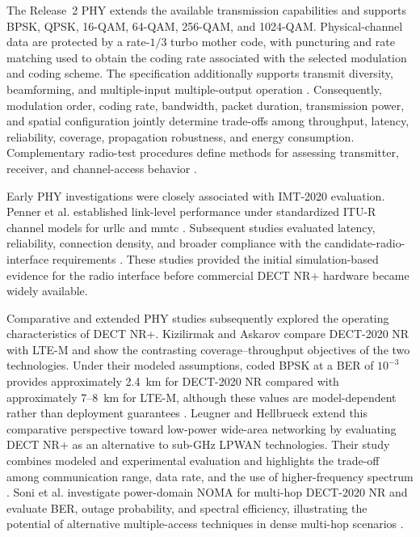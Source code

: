 The Release~2 PHY extends the available transmission capabilities and supports
BPSK, QPSK, 16-QAM, 64-QAM, 256-QAM, and 1024-QAM. Physical-channel data are
protected by a rate-$1/3$ turbo mother code, with puncturing and rate matching
used to obtain the coding rate associated with the selected modulation and
coding scheme. The specification additionally supports transmit diversity,
beamforming, and multiple-input multiple-output operation
\cite{etsi_ts_103636_3_r2}. Consequently, modulation order, coding rate,
bandwidth, packet duration, transmission power, and spatial configuration
jointly determine trade-offs among throughput, latency, reliability, coverage,
propagation robustness, and energy consumption. Complementary radio-test
procedures define methods for assessing transmitter, receiver, and
channel-access behavior
\cite{etsi_tr_103810,etsi_ts_103776}.

Early PHY investigations were closely associated with IMT-2020 evaluation.
Penner et al. established link-level performance under standardized ITU-R
channel models for \gls{urllc} and \gls{mmtc}
\cite{pennerLinkLevelPerformanceEvaluation2021}. Subsequent studies evaluated
latency, reliability, connection density, and broader compliance with the
candidate-radio-interface requirements
\cite{dhanwaniAssessmentCandidateTechnology2020,
pennerURLLCPerformanceEvaluation2021,
maliatsosEvaluationIMT2020Candidate2022a,
smidaETSIDECT2020Component2023}. These studies provided the initial
simulation-based evidence for the radio interface before commercial DECT NR+
hardware became widely available.

Comparative and extended PHY studies subsequently explored the operating
characteristics of DECT NR+. Kizilirmak and Askarov compare DECT-2020 NR with
LTE-M and show the contrasting coverage--throughput objectives of the two
technologies. Under their modeled assumptions, coded BPSK at a BER of
$10^{-3}$ provides approximately 2.4~km for DECT-2020 NR compared with
approximately 7--8~km for LTE-M, although these values are model-dependent
rather than deployment guarantees
\cite{kizilirmakExaminationPHYLayer2024}. Leugner and Hellbrueck extend this
comparative perspective toward low-power wide-area networking by evaluating
DECT NR+ as an alternative to sub-GHz LPWAN technologies. Their study combines
modeled and experimental evaluation and highlights the trade-off among
communication range, data rate, and the use of higher-frequency spectrum
\cite{leugnerAlternativeSubGHzLPWAN2025a}. Soni et al. investigate
power-domain NOMA for multi-hop DECT-2020 NR and evaluate BER, outage
probability, and spectral efficiency, illustrating the potential of
alternative multiple-access techniques in dense multi-hop scenarios
\cite{soniLinkLevelAssessmentNOMA2023}.

